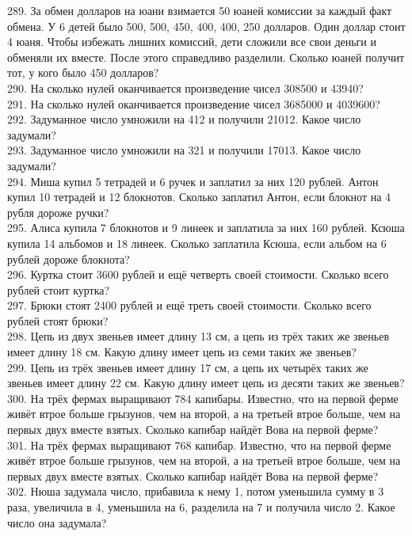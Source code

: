 \documentclass[12pt]{article}
\begin{document}
289. За обмен долларов на юани взимается 50 юаней комиссии за каждый факт обмена. У 6 детей было 500, 500, 450, 400, 400, 250 долларов. Один доллар стоит 4 юаня. Чтобы избежать лишних комиссий, дети сложили все свои деньги и обменяли их вместе. После этого справедливо разделили. Сколько юаней получит тот, у кого было 450 долларов?\\
290. На сколько нулей оканчивается произведение чисел 308500 и 43940?\\
291. На сколько нулей оканчивается произведение чисел 3685000 и 4039600?\\
292. Задуманное число умножили на 412 и получили 21012. Какое число задумали?\\
293. Задуманное число умножили на 321 и получили 17013. Какое число задумали?\\
294. Миша купил 5 тетрадей и 6 ручек и заплатил за них 120 рублей. Антон купил 10 тетрадей и 12 блокнотов. Сколько заплатил Антон, если блокнот на 4 рубля дороже ручки?\\
295. Алиса купила 7 блокнотов и 9 линеек и заплатила за них 160 рублей. Ксюша купила 14 альбомов и 18 линеек. Сколько заплатила Ксюша, если альбом на 6 рублей дороже блокнота?\\
296. Куртка стоит 3600 рублей и ещё четверть своей стоимости. Сколько всего рублей стоит куртка?\\
297. Брюки стоят 2400 рублей и ещё треть своей стоимости. Сколько всего рублей стоят брюки?\\
298. Цепь из двух звеньев имеет длину 13 см, а цепь из трёх таких же звеньев имеет длину 18 см. Какую длину имеет цепь из семи таких же звеньев?\\
299. Цепь из трёх звеньев имеет длину 17 см, а цепь их четырёх таких же звеньев имеет длину 22 см. Какую длину имеет цепь из десяти таких же звеньев?\\
300. На трёх фермах выращивают 784 капибары. Известно, что на первой ферме живёт втрое больше грызунов, чем на второй, а на третьей втрое больше, чем на первых двух вместе взятых. Сколько капибар найдёт Вова на первой ферме?\\
301. На трёх фермах выращивают 768 капибар. Известно, что на первой ферме живёт втрое больше грызунов, чем на второй, а на третьей втрое больше, чем на первых двух вместе взятых. Сколько капибар найдёт Вова на первой ферме?\\
302. Нюша задумала число, прибавила к нему 1, потом уменьшила сумму в 3 раза, увеличила в 4, уменьшила на 6, разделила на 7 и получила число 2. Какое число она задумала?\\
\end{document}
